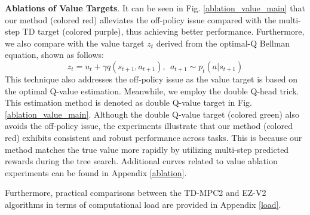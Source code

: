 \textbf{Ablations of Value Targets}. 
It can be seen in Fig. \ref{ablation_value_main} that our method (colored red) alleviates the off-policy issue compared with the multi-step TD target (colored purple), thus achieving better performance. Furthermore, we also compare with the value target 
$z_t$ derived from the optimal-Q Bellman equation, shown as follows:
\begin{equation}
    z_t = u_t + \gamma q(s_{t+1},a_{t+1}), \ \ a_{t+1} \sim p_t(a|s_{t+1})
\end{equation}
This technique also addresses the off-policy issue as the value target is based on the optimal Q-value estimation. Meanwhile, we employ the double Q-head trick. This estimation method is denoted as double Q-value target in Fig. \ref{ablation_value_main}.
Although the double Q-value target (colored green) also avoids the off-policy issue, the experiments illustrate that our method (colored red) exhibits consistent and robust performance across tasks. 
This is because our method matches the true value more rapidly by utilizing multi-step predicted rewards during the tree search.
Additional curves related to value ablation experiments can be found in Appendix \ref{ablation}.


Furthermore, practical comparisons between the TD-MPC2 and EZ-V2 algorithms in terms of computational load are provided in Appendix \ref{load}.






